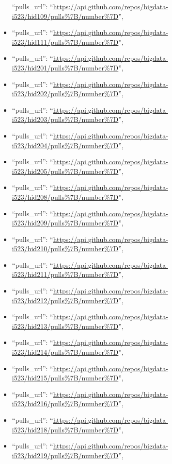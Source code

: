 \begin{itemize}
  ``pulls\_url'':
  ``\url{https://api.github.com/repos/bigdata-i523/hid109/pulls\%7B/number\%7D}'',
\item
  ``pulls\_url'':
  ``\url{https://api.github.com/repos/bigdata-i523/hid111/pulls\%7B/number\%7D}'',
\item
  ``pulls\_url'':
  ``\url{https://api.github.com/repos/bigdata-i523/hid201/pulls\%7B/number\%7D}'',
\item
  ``pulls\_url'':
  ``\url{https://api.github.com/repos/bigdata-i523/hid202/pulls\%7B/number\%7D}'',
\item
  ``pulls\_url'':
  ``\url{https://api.github.com/repos/bigdata-i523/hid203/pulls\%7B/number\%7D}'',
\item
  ``pulls\_url'':
  ``\url{https://api.github.com/repos/bigdata-i523/hid204/pulls\%7B/number\%7D}'',
\item
  ``pulls\_url'':
  ``\url{https://api.github.com/repos/bigdata-i523/hid205/pulls\%7B/number\%7D}'',
\item
  ``pulls\_url'':
  ``\url{https://api.github.com/repos/bigdata-i523/hid208/pulls\%7B/number\%7D}'',
\item
  ``pulls\_url'':
  ``\url{https://api.github.com/repos/bigdata-i523/hid209/pulls\%7B/number\%7D}'',
\item
  ``pulls\_url'':
  ``\url{https://api.github.com/repos/bigdata-i523/hid210/pulls\%7B/number\%7D}'',
\item
  ``pulls\_url'':
  ``\url{https://api.github.com/repos/bigdata-i523/hid211/pulls\%7B/number\%7D}'',
\item
  ``pulls\_url'':
  ``\url{https://api.github.com/repos/bigdata-i523/hid212/pulls\%7B/number\%7D}'',
\item
  ``pulls\_url'':
  ``\url{https://api.github.com/repos/bigdata-i523/hid213/pulls\%7B/number\%7D}'',
\item
  ``pulls\_url'':
  ``\url{https://api.github.com/repos/bigdata-i523/hid214/pulls\%7B/number\%7D}'',
\item
  ``pulls\_url'':
  ``\url{https://api.github.com/repos/bigdata-i523/hid215/pulls\%7B/number\%7D}'',
\item
  ``pulls\_url'':
  ``\url{https://api.github.com/repos/bigdata-i523/hid216/pulls\%7B/number\%7D}'',
\item
  ``pulls\_url'':
  ``\url{https://api.github.com/repos/bigdata-i523/hid218/pulls\%7B/number\%7D}'',
\item
  ``pulls\_url'':
  ``\url{https://api.github.com/repos/bigdata-i523/hid219/pulls\%7B/number\%7D}'',

\end{itemize}
